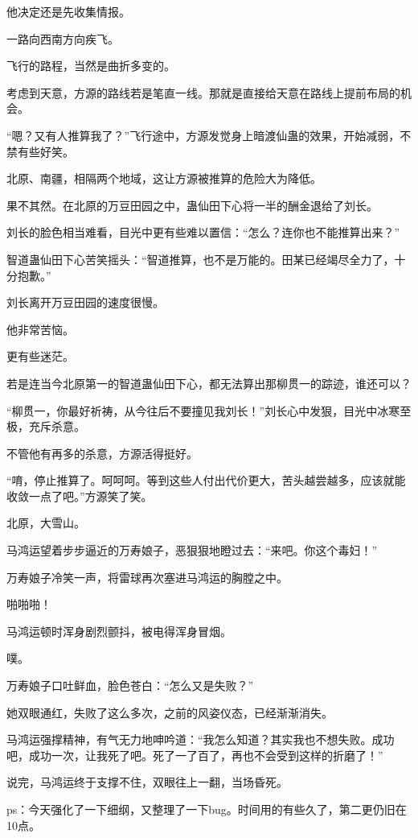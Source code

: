 \begin{this_body}
他决定还是先收集情报。

一路向西南方向疾飞。

飞行的路程，当然是曲折多变的。

考虑到天意，方源的路线若是笔直一线。那就是直接给天意在路线上提前布局的机会。

“嗯？又有人推算我了？”飞行途中，方源发觉身上暗渡仙蛊的效果，开始减弱，不禁有些好笑。

北原、南疆，相隔两个地域，这让方源被推算的危险大为降低。

果不其然。在北原的万豆田园之中，蛊仙田下心将一半的酬金退给了刘长。

刘长的脸色相当难看，目光中更有些难以置信：“怎么？连你也不能推算出来？”

智道蛊仙田下心苦笑摇头：“智道推算，也不是万能的。田某已经竭尽全力了，十分抱歉。”

刘长离开万豆田园的速度很慢。

他非常苦恼。

更有些迷茫。

若是连当今北原第一的智道蛊仙田下心，都无法算出那柳贯一的踪迹，谁还可以？

“柳贯一，你最好祈祷，从今往后不要撞见我刘长！”刘长心中发狠，目光中冰寒至极，充斥杀意。

不管他有再多的杀意，方源活得挺好。

“唷，停止推算了。呵呵呵。等到这些人付出代价更大，苦头越尝越多，应该就能收敛一点了吧。”方源笑了笑。

北原，大雪山。

马鸿运望着步步逼近的万寿娘子，恶狠狠地瞪过去：“来吧。你这个毒妇！”

万寿娘子冷笑一声，将雷球再次塞进马鸿运的胸膛之中。

啪啪啪！

马鸿运顿时浑身剧烈颤抖，被电得浑身冒烟。

噗。

万寿娘子口吐鲜血，脸色苍白：“怎么又是失败？”

她双眼通红，失败了这么多次，之前的风姿仪态，已经渐渐消失。

马鸿运强撑精神，有气无力地呻吟道：“我怎么知道？其实我也不想失败。成功吧，成功一次，让我死了吧。死了一了百了，再也不会受到这样的折磨了！”

说完，马鸿运终于支撑不住，双眼往上一翻，当场昏死。

ps：今天强化了一下细纲，又整理了一下bug。时间用的有些久了，第二更仍旧在10点。

\end{this_body}

